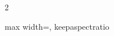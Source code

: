 \begin{multicols}{2}
\begin{center}
\begin{adjustbox}{max width=\linewidth, keepaspectratio}
        \end{adjustbox}
        \captionsetup{width=0.75\linewidth}
        \label{fig:EnergyResolution}
    \end{center}
\endminipage
%
\end{multicols}
%
